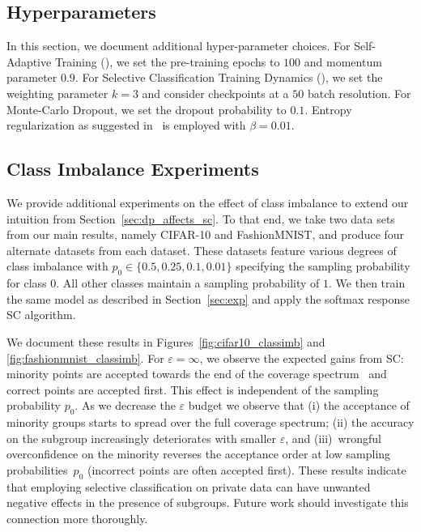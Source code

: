\subsection{Hyperparameters}
\label{sec:hyp}

In this section, we document additional hyper-parameter choices. For Self-Adaptive Training (\sat), we set the pre-training epochs to $100$ and momentum parameter $0.9$. For Selective Classification Training Dynamics (\sctd), we set the weighting parameter $k=3$ and consider checkpoints at a $50$ batch resolution. For Monte-Carlo Dropout, we set the dropout probability to $0.1$. Entropy regularization as suggested in~\citet{feng2023towards} is employed with $\beta = 0.01$.

\subsection{Class Imbalance Experiments}
\label{sec:class_imb_real}

We provide additional experiments on the effect of class imbalance to extend our intuition from Section~\ref{sec:dp_affects_sc}. To that end, we take two data sets from our main results, namely CIFAR-10 and FashionMNIST, and produce four alternate datasets from each dataset. These datasets feature various degrees of class imbalance with $p_0 \in \{0.5,0.25,0.1,0.01\}$ specifying the sampling probability for class $0$. All other classes maintain a sampling probability of $1$. We then train the same model as described in Section~\ref{sec:exp} and apply the softmax response SC algorithm. 

We document these results in Figures~\ref{fig:cifar10_classimb} and \ref{fig:fashionmnist_classimb}. For $\varepsilon = \infty$, we observe the expected gains from SC: minority points are accepted towards the end of the coverage spectrum~\citep{jones2020selective} and correct points are accepted first. This effect is independent of the sampling probability $p_0$. As we decrease the $\varepsilon$ budget we observe that (i) the acceptance of minority groups starts to spread over the full coverage spectrum; (ii) the accuracy on the subgroup increasingly deteriorates with smaller $\varepsilon$, and (iii)~wrongful overconfidence on the minority reverses the acceptance order at low sampling probabilities~$p_0$ (\ie incorrect points are often accepted first). These results indicate that employing selective classification on private data can have unwanted negative effects in the presence of subgroups. Future work should investigate this connection more thoroughly.

